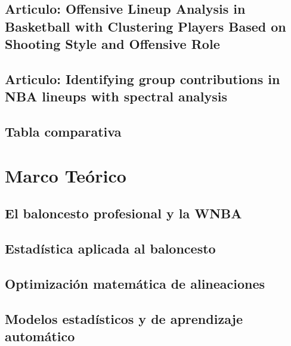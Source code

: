 \documentclass[12pt,letterpaper]{report}
\begin{document}
\section{Articulo: Offensive Lineup Analysis in Basketball with Clustering Players Based on Shooting Style and Offensive Role}

\section{Articulo: Identifying group contributions in NBA lineups with spectral analysis}

\section{Tabla comparativa}



\chapter{Marco Teórico}
\section{El baloncesto profesional y la WNBA}

\section{Estadística aplicada al baloncesto}

\section{Optimización matemática de alineaciones}

\section{Modelos estadísticos y de aprendizaje automático}

\end{document}
